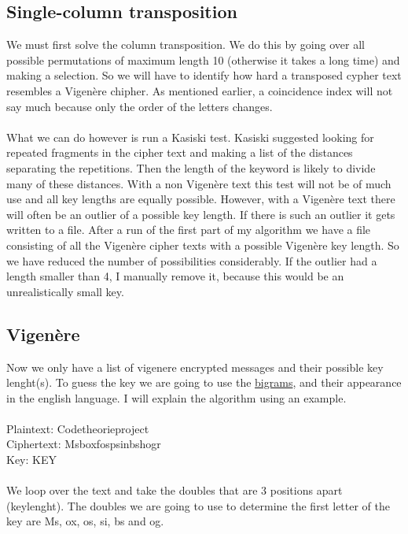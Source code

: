 \documentclass{article}
\begin{document}
\subsection{Single-column transposition}
We must first solve the column transposition. We do this by going over all possible permutations of maximum length 10 (otherwise it takes a long time) and making a selection. So we will have to identify how hard a transposed cypher text resembles a Vigenère chipher. As mentioned earlier, a coincidence index will not say much because only the order of the letters changes.\\
\\
What we can do however is run a Kasiski test. Kasiski suggested looking for repeated fragments in the cipher text and making a list of the distances separating the repetitions. Then the length of the keyword is likely to divide many of these distances. With a non Vigenère text this test will not be of much use and all key lengths are equally possible. However, with a Vigenère text there will often be an outlier of a possible key length. If there is such an outlier it gets written to a file. After a run of the first part of my algorithm we have a file consisting of all the Vigenère cipher texts with a possible Vigenère key length. So we have reduced the number of possibilities considerably. If the outlier had a length smaller than 4, I manually remove it, because this would be an unrealistically small key.\\

\subsection{Vigenère}
Now we only have a list of vigenere encrypted messages and their possible key lenght(s). To guess the key we are going to use the \href{http://practicalcryptography.com/media/cryptanalysis/files/english_bigrams_1.txt}{bigrams}, and their appearance in the english language. I will explain the algorithm using an example.\\
\\
Plaintext: Codetheorieproject\\
Ciphertext: Msboxfospsinbshogr\\
Key: KEY\\
\\
We loop over the text and take the doubles that are 3 positions apart (keylenght). The doubles we are going to use to determine the first letter of the key are Ms, ox, os, si, bs and og.\\
\end{document}
